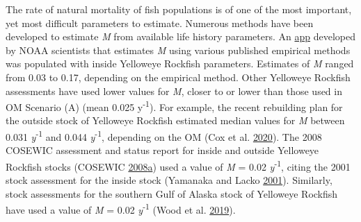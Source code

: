 \documentclass[11pt]{book}
\begin{document}
The rate of natural mortality of fish populations is of one of the most important, yet most difficult parameters to estimate. Numerous methods have been developed to estimate \emph{M} from available life history parameters. An \href{http://barefootecologist.com.au/shiny_m.html}{app} developed by NOAA scientists that estimates \emph{M} using various published empirical methods was populated with inside Yelloweye Rockfish parameters. Estimates of \emph{M} ranged from 0.03 to 0.17, depending on the empirical method. Other Yelloweye Rockfish assessments have used lower values for \emph{M}, closer to or lower than those used in OM Scenario (A) (mean 0.025 y\textsuperscript{-1}). For example, the recent rebuilding plan for the outside stock of Yelloweye Rockfish estimated median values for \emph{M} between 0.031 \emph{y}\textsuperscript{-1} and 0.044 \emph{y}\textsuperscript{-1}, depending on the OM (Cox et al. \protect\hyperlink{ref-cox2020}{2020}). The 2008 COSEWIC assessment and status report for inside and outside Yelloweye Rockfish stocks (COSEWIC \protect\hyperlink{ref-cosewic2008}{2008}\protect\hyperlink{ref-cosewic2008}{a}) used a value of \emph{M} = 0.02 \emph{y}\textsuperscript{-1}, citing the 2001 stock assessment for the inside stock (Yamanaka and Lacko \protect\hyperlink{ref-yamanaka2001}{2001}). Similarly, stock assessments for the southern Gulf of Alaska stock of Yelloweye Rockfish have used a value of \emph{M} = 0.02 \emph{y}\textsuperscript{-1} (Wood et al. \protect\hyperlink{ref-wood2019}{2019}).
\end{document}
